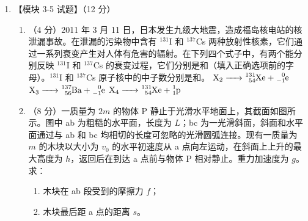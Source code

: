 \documentclass[\gkver]{gaokaozhenti}
\begin{document}
\begin{enumerate}
{（ii）潜水员和 Q 点连线与水平方向夹角刚好为临界角 C，则 $\sin C=\frac{1}{n}=\frac{3}{4}$ ④，$\tan C=\frac{h_{2}+\Delta h}{s_{1}+s_{2}+l}$ ⑤，由④⑤式得 $l=\left(\frac{8\sqrt{7}}{3}-3.8\right)\Um\approx3.3\Um$。
}

\item
【模块 3-5 试题】（12 分）
\begin{enumerate}
	\item
	（4 分）2011 年 3 月 11 日，日本发生九级大地震，造成福岛核电站的核泄漏事故。在泄漏的污染物中含有 $^{131}$I 和 $^{137}$Cs 两种放射性核素，它们通过一系列衰变产生对人体有危害的辐射。在下列四个式子中，有两个能分别反映 $^{131}$I 和 $^{137}$Cs 的衰变过程，它们分别是和（填入正确选项前的字母）。$^{131}$I 和 $^{137}$Cs 原子核中的中子数分别是和。
	{$\ce{X_{2} -> ^{131}_{54}Xe + ^{0}_{-1}e}$}
	{$\ce{X_{3} -> ^{137}_{56}Ba + ^{0}_{-1}e}$}
	{$\ce{X_{4} -> ^{131}_{54}Xe + ^{1}_{1}p}$}
	\item
	（8 分）一质量为 $2m$ 的物体 P 静止于光滑水平地面上，其截面如图所示。图中 ab 为粗糙的水平面，长度为 $L$；bc 为一光滑斜面，斜面和水平面通过与 ab 和 bc 均相切的长度可忽略的光滑圆弧连接。现有一质量为 $m$ 的木块以大小为 $v_{0}$ 的水平初速度从 a 点向左运动，在斜面上上升的最大高度为 $h$，返回后在到达 a 点前与物体 P 相对静止。重力加速度为 $g$。求：
	\begin{enumerate}[label = (\roman*)]
		\item
		木块在 ab 段受到的摩擦力 $f$；
		\item
		木块最后距 a 点的距离 $s$。
	\end{enumerate}
\end{enumerate}


\end{enumerate}
\end{document}
